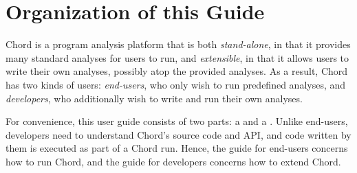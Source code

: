\chapter{Organization of this Guide}
\label{chap:organization}

Chord is a program analysis platform that is both {\it stand-alone}, in that it
provides many standard analyses for users to run, and {\it extensible}, in that
it allows users to write their own analyses, possibly atop the provided
analyses.
As a result, Chord has two kinds of users: {\it end-users}, who only wish to run predefined
analyses, and {\it developers}, who additionally wish to write and run their
own analyses.

For convenience, this user guide consists of two parts: a
 and a
.  Unlike end-users,
developers need to understand Chord's source code and API, and code written by
them is executed as part of a Chord run.  Hence, the guide for end-users
concerns how to run Chord, and the guide for developers concerns how to extend
Chord.

